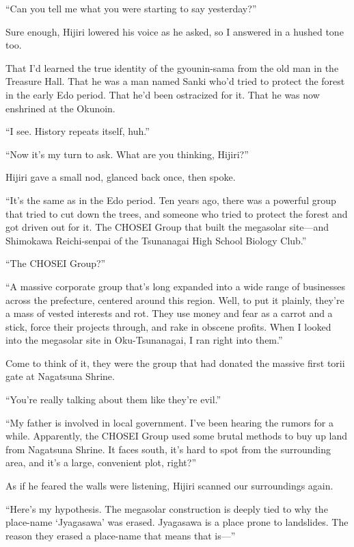 \documentclass[
    a4paper,
    12pt,
    twoside,
    openany,
    UTF8,
    fontset=windows
]{ctexbook}
\begin{document}
``Can you tell me what you were starting to say yesterday?''

Sure enough, Hijiri lowered his voice as he asked, so I answered in a hushed tone too.

That I'd learned the true identity of the gyounin-sama from the old man in the Treasure Hall. That he was a man named Sanki who'd tried to protect the forest in the early Edo period. That he'd been ostracized for it. That he was now enshrined at the Okunoin.

``I see. History repeats itself, huh.''

``Now it's my turn to ask. What are you thinking, Hijiri?''

Hijiri gave a small nod, glanced back once, then spoke.

``It's the same as in the Edo period. Ten years ago, there was a powerful group that tried to cut down the trees, and someone who tried to protect the forest and got driven out for it. The CHOSEI Group that built the megasolar site---and Shimokawa Reichi-senpai of the Tsunanagai High School Biology Club.''

``The CHOSEI Group?''

``A massive corporate group that's long expanded into a wide range of businesses across the prefecture, centered around this region. Well, to put it plainly, they're a mass of vested interests and rot. They use money and fear as a carrot and a stick, force their projects through, and rake in obscene profits. When I looked into the megasolar site in Oku-Tsunanagai, I ran right into them.''

Come to think of it, they were the group that had donated the massive first torii gate at Nagatsuna Shrine.

``You're really talking about them like they're evil.''

``My father is involved in local government. I've been hearing the rumors for a while. Apparently, the CHOSEI Group used some brutal methods to buy up land from Nagatsuna Shrine. It faces south, it's hard to spot from the surrounding area, and it's a large, convenient plot, right?''

As if he feared the walls were listening, Hijiri scanned our surroundings again.

``Here's my hypothesis. The megasolar construction is deeply tied to why the place-name `Jyagasawa' was erased. Jyagasawa is a place prone to landslides. The reason they erased a place-name that means that is---''
\end{document}
